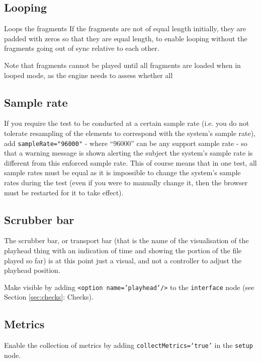 \documentclass[11pt, oneside]{article}   	%
\begin{document}

	\subsection{Looping}
		Loops the fragments 
		If the fragments are not of equal length initially, they are padded with zeros so that they are equal length, to enable looping without the fragments going out of sync relative to each other. 

		Note that fragments cannot be played until all fragments are loaded when in looped mode, as the engine needs to assess whether all %

	\subsection{Sample rate}
		If you require the test to be conducted at a certain sample rate (i.e. you do not tolerate resampling of the elements to correspond with the system's sample rate), add \texttt{sampleRate="96000"} - where ``96000'' can be any support sample rate - so that a warning message is shown alerting the subject the system's sample rate is different from this enforced sample rate. This of course means that in one test, all sample rates must be equal as it is impossible to change the system's sample rates during the test (even if you were to manually change it, then the browser must be restarted for it to take effect). 

	\subsection{Scrubber bar}
		The scrubber bar, or transport bar (that is the name of the visualisation of the playhead thing with an indication of time and showing the portion of the file played so far) is at this point just a visual, and not a controller to adjust the playhead position.

		Make visible by adding \texttt{<option name='playhead'/>} to the \texttt{interface} node (see Section \ref{sec:checks}: Checks). 

	\subsection{Metrics}
		Enable the collection of metrics by adding \texttt{collectMetrics=`true'} in the \texttt{setup} node. 
\end{document}
